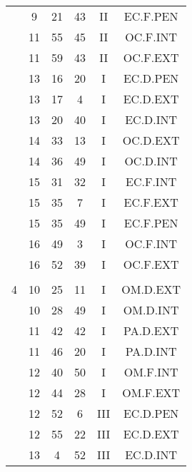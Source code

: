 \documentclass[12pt, a4paper]{article}
\begin{document}
\begin{multicols}{3}
{\begin{tabular}{c c c c c c}
	 	 	 	 & 9 & 21 & 43 & II & EC.F.PEN\\%
	 	 	 	 & 11 & 55 & 45 & II & OC.F.INT\\%
	 	 	 	 & 11 & 59 & 43 & II & OC.F.EXT\\%
	 	 	 	 & 13 & 16 & 20 & I & EC.D.PEN\\%
	 	 	 	 & 13 & 17 & 4 & I & EC.D.EXT\\%
	 	 	 	 & 13 & 20 & 40 & I & EC.D.INT\\%
	 	 	 	 & 14 & 33 & 13 & I & OC.D.EXT\\%
	 	 	 	 & 14 & 36 & 49 & I & OC.D.INT\\%
	 	 	 	 & 15 & 31 & 32 & I & EC.F.INT\\%
	 	 	 	 & 15 & 35 & 7 & I & EC.F.EXT\\%
	 	 	 	 & 15 & 35 & 49 & I & EC.F.PEN\\%
	 	 	 	 & 16 & 49 & 3 & I & OC.F.INT\\%
	 	 	 	 & 16 & 52 & 39 & I & OC.F.EXT\\%
	 	 	 	 & & & & & \\%
	 	 	 	4 & 10 & 25 & 11 & I & OM.D.EXT\\%
	 	 	 	 & 10 & 28 & 49 & I & OM.D.INT\\%
	 	 	 	 & 11 & 42 & 42 & I & PA.D.EXT\\%
	 	 	 	 & 11 & 46 & 20 & I & PA.D.INT\\%
	 	 	 	 & 12 & 40 & 50 & I & OM.F.INT\\%
	 	 	 	 & 12 & 44 & 28 & I & OM.F.EXT\\%
	 	 	 	 & 12 & 52 & 6 & III & EC.D.PEN\\%
	 	 	 	 & 12 & 55 & 22 & III & EC.D.EXT\\%
	 	 	 	 & 13 & 4 & 52 & III & EC.D.INT\\%

\end{tabular}}
\end{multicols}
\end{document}
